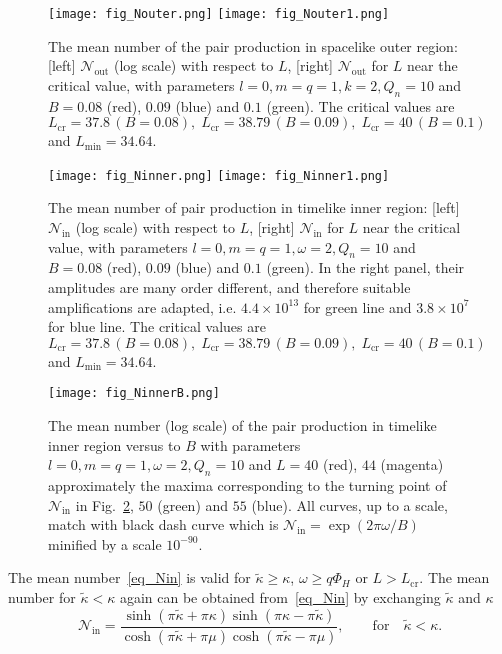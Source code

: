 \documentclass[aps,nofootinbib,superscriptaddress
]{revtex4}
\begin{document}
\begin{figure}
\texttt{[image: fig\_Nouter.png]}
\hspace{.5cm}
\texttt{[image: fig\_Nouter1.png]}
\caption{The mean number of the pair production in spacelike outer region: [left] $\mathcal{N}_\mathrm{out}$ (log scale) with respect to $L$, [right] $\mathcal{N}_\mathrm{out}$ for $L$ near the critical value, with parameters $l = 0, m = q = 1, k = 2, Q_n = 10$ and $B = 0.08$ (red), $0.09$ (blue) and $0.1$ (green). The critical values are $L_\mathrm{cr} = 37.8 \, (B = 0.08), \; L_\mathrm{cr} = 38.79 \, (B = 0.09), \; L_\mathrm{cr} = 40 \, (B = 0.1)$ and $L_\mathrm{min} = 34.64$.}
\label{fig_Nout}
\end{figure}


\begin{figure}
\texttt{[image: fig\_Ninner.png]}
\hspace{.5cm}
\texttt{[image: fig\_Ninner1.png]}
\caption{The mean number of pair production in timelike inner region: [left] $\mathcal{N}_\mathrm{in}$ (log scale) with respect to $L$, [right] $\mathcal{N}_\mathrm{in}$ for $L$ near the critical value, with parameters $l = 0, m = q = 1, \omega = 2, Q_n = 10$ and $B = 0.08$ (red), $0.09$ (blue) and $0.1$ (green). In the right panel, their amplitudes are many order different, and therefore suitable amplifications are adapted, i.e. $4.4 \times 10^{13}$ for green line and $3.8 \times 10^7$ for blue line. The critical values are $L_\mathrm{cr} = 37.8 \, (B = 0.08), \; L_\mathrm{cr} = 38.79 \, (B = 0.09), \; L_\mathrm{cr} = 40 \, (B = 0.1)$ and $L_\mathrm{min} = 34.64$.}
\label{fig_Nin}
\end{figure}

\begin{figure}
\texttt{[image: fig\_NinnerB.png]}
\caption{The mean number (log scale) of the pair production in timelike inner region versus to $B$ with parameters $l = 0, m = q = 1, \omega = 2, Q_n = 10$ and $L = 40$ (red), $44$ (magenta) approximately the maxima corresponding to the turning point of $\mathcal{N}_\mathrm{in}$ in Fig.~\ref{fig_Nin}, $50$ (green) and $55$ (blue). All curves, up to a scale, match with black dash curve which is $\mathcal{N}_\mathrm{in} = \exp(2 \pi \omega/B)$ minified by a scale $10^{-90}$.}
\label{fig_NinB}
\end{figure}

The mean number~\eqref{eq_Nin} is valid for $\tilde{\kappa} \ge \kappa$, $\omega \ge q \Phi_H$ or $L > L_\mathrm{cr}$. The mean number for $\tilde{\kappa} < \kappa$ again can be obtained from~\eqref{eq_Nin} by exchanging $\tilde{\kappa}$ and $\kappa$
\begin{equation} \label{eq_Nina}
\mathcal{N}_\mathrm{in} = \frac{\sinh(\pi \tilde{\kappa} + \pi \kappa) \sinh(\pi \kappa - \pi \tilde{\kappa})}{\cosh(\pi \tilde{\kappa} + \pi \mu) \cosh(\pi \tilde{\kappa} - \pi \mu)}, \qquad \mathrm{for} \quad \tilde\kappa < \kappa.
\end{equation}
\end{document}

